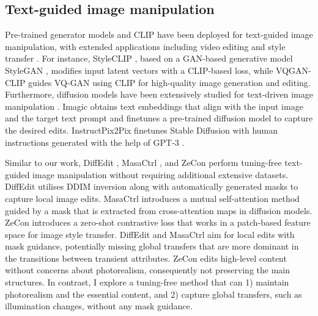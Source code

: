 \subsection{Text-guided image manipulation}
Pre-trained generator models and CLIP \cite{radford2021learning} have been deployed for text-guided image manipulation, with extended applications including video editing and style transfer \cite{bar2022text2live,gal2022stylegan,kwon2022clipstyler,liu2021fusedream,patashnik2021styleclip}. For instance, StyleCLIP \cite{patashnik2021styleclip}, based on a \gls{GAN}-based generative model StyleGAN \cite{karras2020analyzing}, modifies input latent vectors with a CLIP-based loss, while VQGAN-CLIP \cite{crowson2022vqgan} guides VQ-GAN \cite{esser2021taming} using CLIP for high-quality image generation and editing. Furthermore, diffusion models have been extensively studied for text-driven image manipulation \cite{avrahami2022blended,gal2022image,kawar2023imagic,kim2022diffusionclip,liu2023more,meng2021sdedit,nichol2021glide,ruiz2023dreambooth}. Imagic \cite{kawar2023imagic} obtains text embeddings that align with the input image and the target text prompt and finetunes a pre-trained diffusion model to capture the desired edits. InstructPix2Pix \cite{brooks2023instructpix2pix} finetunes Stable Diffusion \cite{rombach2022high} with human instructions generated with the help of GPT-3 \cite{brown2020language}.

Similar to our work, DiffEdit \cite{couairon2022diffedit}, MasaCtrl \cite{cao2023masactrl}, and ZeCon \cite{yang2023zero} perform tuning-free text-guided image manipulation without requiring additional extensive datasets. DiffEdit \cite{couairon2022diffedit} utilises DDIM inversion \cite{dhariwal2021diffusion,song2020denoising} along with automatically generated masks to capture local image edits. MasaCtrl \cite{cao2023masactrl} introduces a mutual self-attention method guided by a mask that is extracted from cross-attention maps in diffusion models. ZeCon \cite{yang2023zero} introduces a zero-shot contrastive loss that works in a patch-based feature space for image style transfer. DiffEdit \cite{couairon2022diffedit} and MasaCtrl \cite{cao2023masactrl} aim for local edits with mask guidance, potentially missing global transfers that are more dominant in the transitions between transient attributes. ZeCon \cite{yang2023zero} edits high-level content without concerns about photorealism, consequently not preserving the main structures. In contrast, I explore a tuning-free method that can 1) maintain photorealism and the essential content, and 2) capture global transfers, such as illumination changes, without any mask guidance.

